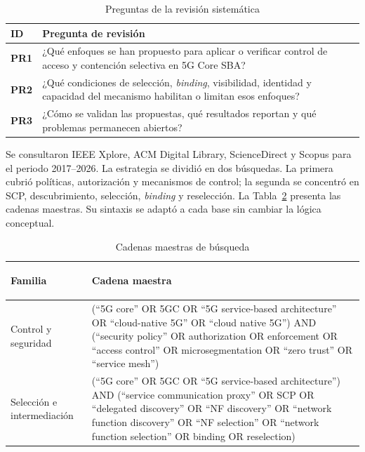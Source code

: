 \begin{table}[H]
    \centering
    \caption{Preguntas de la revisión sistemática}
    \label{tab:preguntas-rsl}
    \small
    \begin{singlespace}
    \begin{tabularx}{\textwidth}{@{}>{\bfseries}p{1.2cm}X@{}}
        \toprule
        ID & Pregunta de revisión \\
        \midrule
        PR1 & ¿Qué enfoques se han propuesto para aplicar o verificar control de acceso y contención selectiva en 5G Core SBA? \\
        PR2 & ¿Qué condiciones de selección, \textit{binding}, visibilidad, identidad y capacidad del mecanismo habilitan o limitan esos enfoques? \\
        PR3 & ¿Cómo se validan las propuestas, qué resultados reportan y qué problemas permanecen abiertos? \\
        \bottomrule
    \end{tabularx}
    \end{singlespace}
\end{table}

Se consultaron IEEE Xplore, ACM Digital Library, ScienceDirect y Scopus para el periodo 2017--2026. La estrategia se dividió en dos búsquedas. La primera cubrió políticas, autorización y mecanismos de control; la segunda se concentró en SCP, descubrimiento, selección, \textit{binding} y reselección. La Tabla~\ref{tab:cadenas-rsl} presenta las cadenas maestras. Su sintaxis se adaptó a cada base sin cambiar la lógica conceptual.

\begin{table}[H]
    \centering
    \caption{Cadenas maestras de búsqueda}
    \label{tab:cadenas-rsl}
    \footnotesize
    \begin{singlespace}
    \begin{tabularx}{\textwidth}{@{}>{\bfseries\raggedright\arraybackslash}p{2.8cm}>{\raggedright\arraybackslash}X@{}}
        \toprule
        Familia & Cadena maestra \\
        \midrule
        Control y seguridad &
        (``5G core'' OR 5GC OR ``5G service-based architecture'' OR ``cloud-native 5G'' OR ``cloud native 5G'') AND (``security policy'' OR authorization OR enforcement OR ``access control'' OR microsegmentation OR ``zero trust'' OR ``service mesh'') \\
        \addlinespace
        Selección e intermediación &
        (``5G core'' OR 5GC OR ``5G service-based architecture'') AND (``service communication proxy'' OR SCP OR ``delegated discovery'' OR ``NF discovery'' OR ``network function discovery'' OR ``NF selection'' OR ``network function selection'' OR binding OR reselection) \\
        \bottomrule
    \end{tabularx}
    \end{singlespace}
\end{table}

